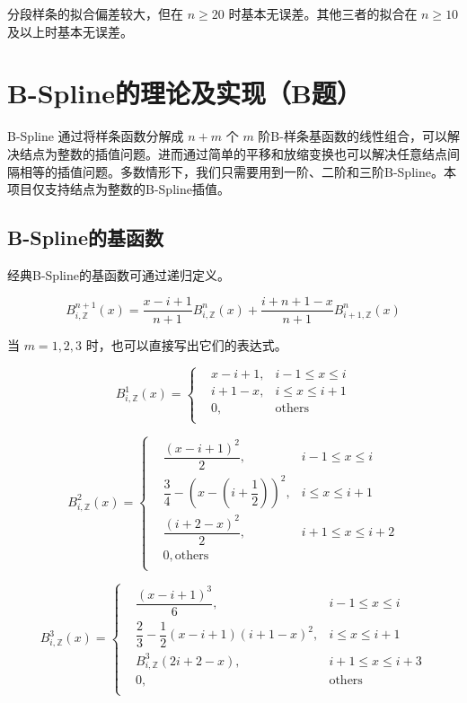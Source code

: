 \documentclass{ctexart}
\begin{document}
分段样条的拟合偏差较大，但在 $n\geq 20$ 时基本无误差。其他三者的拟合在 $n\geq 10$ 及以上时基本无误差。

\section{B-Spline的理论及实现（B题）}

B-Spline 通过将样条函数分解成 $n+m$ 个 $m$ 阶B-样条基函数的线性组合，可以解决结点为整数的插值问题。进而通过简单的平移和放缩变换也可以解决任意结点间隔相等的插值问题。多数情形下，我们只需要用到一阶、二阶和三阶B-Spline。本项目仅支持结点为整数的B-Spline插值。

\subsection{B-Spline的基函数}

经典B-Spline的基函数可通过递归定义。

\begin{equation}
    B_{i,\mathbb{Z}}^{n+1}(x)=\dfrac{x-i+1}{n+1}B_{i,\mathbb{Z}}^n(x)+\dfrac{i+n+1-x}{n+1}B_{i+1,\mathbb{Z}}^n(x)
\end{equation}

当 $m=1,2,3$ 时，也可以直接写出它们的表达式。

\begin{equation}
B_{i,\mathbb{Z}}^1(x)=\left\{
\begin{aligned}
    & x-i+1, & i-1\leq x\leq i\\
    & i+1-x, & i\leq x\leq i+1\\
    & 0, & \text{others}\\
\end{aligned}
\right.
\end{equation}

\begin{equation}
B_{i,\mathbb{Z}}^2(x)=\left\{
\begin{aligned}
    & \dfrac{(x-i+1)^2}2, & i-1\leq x\leq i\\
    & \dfrac 34 - (x-(i+\dfrac 12))^2, & i\leq x\leq i+1\\
    & \dfrac{(i+2-x)^2}2, & i+1\leq x\leq i+2\\
    & 0,\text{others}\\
\end{aligned}
\right.
\end{equation}

\begin{equation}
B_{i,\mathbb{Z}}^3(x)=\left\{
\begin{aligned}
    & \dfrac{(x-i+1)^3}6, & i-1\leq x\leq i\\
    & \dfrac 23 - \dfrac 12 (x-i+1)(i+1-x)^2, & i\leq x\leq i+1\\
    & B_{i,\mathbb{Z}}^3(2i+2-x), & i+1\leq x\leq i+3\\
    & 0, & \text{others}\\
\end{aligned}
\right.
\end{equation}
\end{document}
